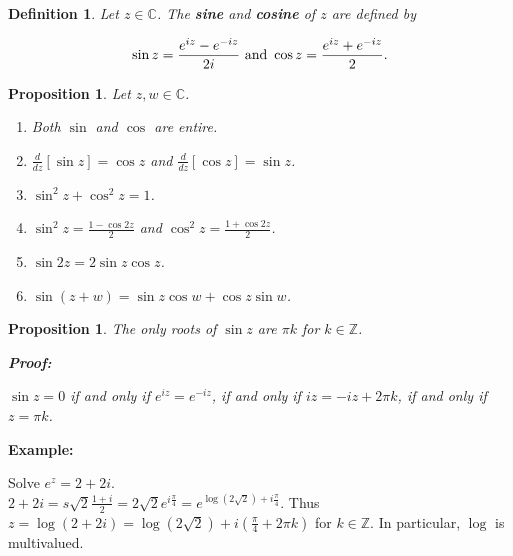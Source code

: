 \documentclass{article}
\theoremstyle{colontheorem}
\newtheorem{proposition}[theorem]{Proposition}
\newtheorem{definition}[theorem]{Definition}
\newenvironment{Proposition}
{
	\begin{mdframed}[backgroundcolor=TheoremOrange!10]
	\begin{proposition}
}
{
	\end{proposition}
	\end{mdframed}
	
	\vspace{.15in}
}
\newenvironment{Def}
{
	\begin{mdframed}[backgroundcolor=DefGreen!10]
	\begin{definition}
}
{
	\end{definition}
	\end{mdframed}
	
	\vspace{.15in}
}
\newenvironment{Proof}
{
	\begin{mdframed}[backgroundcolor=ProofPurple!10]
	\textbf{Proof:}%
}
{
	\end{mdframed}
	
	\vspace{.085in}
}
\newenvironment{Example}
{
	\begin{mdframed}
	\textbf{Example:}%
}
{
	\end{mdframed}
	
	\vspace{.15in}
}
\begin{document}
\begin{Def}
	
	Let $z \in \mathbb{C}$. The \textbf{sine} and \textbf{cosine} of $z$ are defined by
	
	$$
		\sin z = \frac{e^{iz} - e^{-iz}}{2i} \textnormal{ and } \cos z = \frac{e^{iz} + e^{-iz}}{2}\textnormal{.}
	$$
	
\end{Def}



\begin{Proposition}
	
	Let $z, w \in \mathbb{C}$.
	
	\begin{enumerate}
		
		\item Both $\sin$ and $\cos$ are entire.
		
		\item $\frac{d}{dz} \left[ \sin z \right] = \cos z$ and $\frac{d}{dz} \left[ \cos z \right] = \sin z$.
		
		\item $\sin^2 z + \cos^2 z = 1$.
		
		\item $\sin^2 z = \frac{1 - \cos 2z}{2}$ and $\cos^2 z = \frac{1 + \cos 2z}{2}$.
		
		\item $\sin 2z = 2\sin z \cos z$.
		
		\item $\sin (z + w) = \sin z \cos w + \cos z \sin w$.
		
	\end{enumerate}
	
\end{Proposition}



\begin{Proposition}
	
	The only roots of $\sin z$ are $\pi k$ for $k \in \mathbb{Z}$.
	
	\begin{Proof}
		$\sin z = 0$ if and only if $e^{iz} = e^{-iz}$, if and only if $iz = -iz + 2 \pi k$, if and only if $z = \pi k$.
		
	\end{Proof}
	
\end{Proposition}



\begin{Example}
	Solve $e^z = 2 + 2i$.\\
	
	$2 + 2i = s \sqrt{2} \frac{1 + i}{2} = 2 \sqrt{2} e^{i \frac{\pi}{4}} = e^{\log (2 \sqrt{2}) + i \frac{\pi}{4}}$. Thus $z = \log (2 + 2i) = \log (2 \sqrt{2}) + i (\frac{\pi}{4} + 2\pi k)$ for $k \in \mathbb{Z}$. In particular, $\log$ is multivalued.
	
\end{Example}
\end{document}
